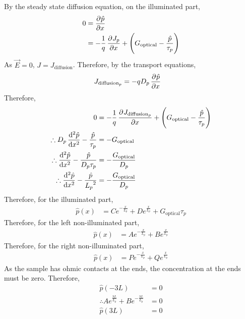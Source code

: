 \documentclass[fleqn, a4paper, 11pt, oneside]{amsart}
\theoremstyle{definition}
\theoremstyle{theorem}
\begin{document}
\begin{solution}
	By the steady state diffusion equation, on the illuminated part,
	\begin{align*}
		0 & = \dpd{\hat{p}}{x} \\
                  & = -\frac{1}{q} \dpd{J_p}{x} + \left( G_{\text{optical}} - \frac{\hat{p}}{\tau_p} \right)
	\end{align*}
	As $\overrightarrow{E} = 0$, $J = J_{\text{diffusion}}$.
	Therefore, by the transport equations,
	\begin{align*}
		J_{\text{diffusion}_p} & = -q D_p \dpd{\hat{p}}{x}
	\end{align*}
	Therefore,
	\begin{align*}
		0                                                           & = -\frac{1}{q} \dpd{J_{\text{diffusion}_p}}{x} + \left( G_{\text{optical}} - \frac{\hat{p}}{\tau_p} \right) \\
		\therefore D_p \dod[2]{\hat{p}}{x} - \frac{\hat{p}}{\tau_p} & = -G_{\text{optical}}                                                                                       \\
		\therefore \dod[2]{\hat{p}}{x} - \frac{\hat{p}}{D_p \tau_p} & = -\frac{G_{\text{optical}}}{D_p}                                                                           \\
		\therefore \dod[2]{\hat{p}}{x} -\frac{\hat{p}}{{L_p}^2}     & = -\frac{G_{\text{optical}}}{D_p}
	\end{align*}
	Therefore, for the illuminated part,
	\begin{align*}
		\hat{p}(x) & = C e^{-\frac{x}{L_p}} + D e^{\frac{x}{L_p}} + G_{\text{optical}} \tau_p
	\end{align*}
	Therefore, for the left non-illuminated part,
	\begin{align*}
		\hat{p}(x) & = A e^{-\frac{x}{L_p}} + B e^{\frac{x}{L_p}}
	\end{align*}
	Therefore, for the right non-illuminated part,
	\begin{align*}
		\hat{p}(x) & = P e^{-\frac{x}{L_p}} + Q e^{\frac{x}{L_p}}
	\end{align*}
	As the sample has ohmic contacts at the ends, the concentration at the ends must be zero.
	Therefore,
	\begin{align*}
		\hat{p}(-3 L)                                             & = 0 \\
		\therefore A e^{\frac{3 L}{L_p}} + B e^{-\frac{3 L}{L_p}} & = 0 \\
		\hat{p}(3 L)                                              & = 0 \\

\end{align*}
\end{solution}
\end{document}
